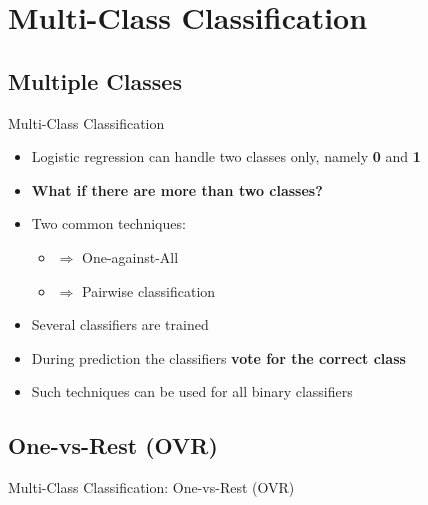 \section{Multi-Class Classification}

\subsection{Multiple Classes}

\begin{frame}{Multi-Class Classification}{}
	\begin{itemize}
		\item Logistic regression can handle two classes only, namely \textbf{0} and \textbf{1}
		\item \textbf{What if there are more than two classes?}
		\item Two common techniques:
		\begin{itemize}
			\item {} 	$\Rightarrow$ One-against-All
			\item {} 	$\Rightarrow$ Pairwise classification
		\end{itemize}
		\item Several classifiers are trained
		\item During prediction the classifiers \textbf{vote for the correct class}
		\item Such techniques can be used for all binary classifiers
	\end{itemize}
\end{frame}


\subsection{One-vs-Rest (OVR)}

\begin{frame}{Multi-Class Classification: One-vs-Rest (OVR)}{}
\end{frame}


